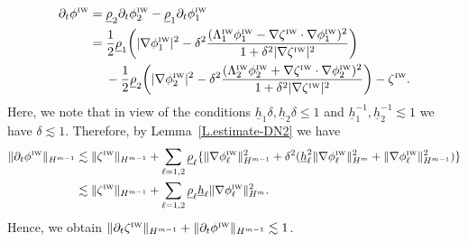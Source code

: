 \documentclass[11pt,leqno]{article}
\numberwithin{equation}{section}
\numberwithin{figure}{section}
\begin{document}
\begin{align*}
\partial_t\phi^{\mbox{\rm\tiny IW}}
&= \underline{\rho}_2\partial_t\phi_2^{\mbox{\rm\tiny IW}} - \underline{\rho}_1\partial_t\phi_1^{\mbox{\rm\tiny IW}} \\
&= \frac12\underline{\rho}_1\biggl( |\nabla\phi_1^{\mbox{\rm\tiny IW}}|^2
 - \delta^2 \frac{(\Lambda_1^{\mbox{\rm\tiny IW}}\phi_1^{\mbox{\rm\tiny IW}}
  - \nabla\zeta^{\mbox{\rm\tiny IW}} \cdot \nabla\phi_1^{\mbox{\rm\tiny IW}} )^2}{
  1+\delta^2|\nabla\zeta^{\mbox{\rm\tiny IW}}|^2} \biggr) \\
&\quad\;
 - \frac12\underline{\rho}_2\biggl( |\nabla\phi_2^{\mbox{\rm\tiny IW}}|^2
  - \delta^2 \frac{(\Lambda_2^{\mbox{\rm\tiny IW}}\phi_2^{\mbox{\rm\tiny IW}}
   + \nabla\zeta^{\mbox{\rm\tiny IW}} \cdot \nabla\phi_2^{\mbox{\rm\tiny IW}} )^2}{
  1+\delta^2|\nabla\zeta^{\mbox{\rm\tiny IW}}|^2} \biggr)
 - \zeta^{\mbox{\rm\tiny IW}}.
\end{align*}
%
Here, we note that in view of the conditions $\underline{h}_1\delta, \underline{h}_2\delta \leq 1$ and 
$\underline{h}_1^{-1}, \underline{h}_2^{-1}\lesssim 1$ we have $\delta\lesssim 1$. 
Therefore, by Lemma~\ref{L.estimate-DN2} we have 
%
\begin{align*}
\|\partial_t\phi^{\mbox{\rm\tiny IW}}\|_{H^{m-1}}
&\lesssim \|\zeta^{\mbox{\rm\tiny IW}}\|_{H^{m-1}}
 + \sum_{\ell=1,2}\underline{\rho}_\ell\{
  \|\nabla\phi_\ell^{\mbox{\rm\tiny IW}}\|_{H^{m-1}}^2
 + \delta^2(\underline{h}_\ell^2\|\nabla\phi_\ell^{\mbox{\rm\tiny IW}}\|_{H^m}^2
  + \|\nabla\phi_\ell^{\mbox{\rm\tiny IW}}\|_{H^{m-1}}^2) \} \\
&\lesssim \|\zeta^{\mbox{\rm\tiny IW}}\|_{H^{m-1}}
 + \sum_{\ell=1,2} \underline{\rho}_\ell \underline{h}_\ell \|\nabla\phi_\ell^{\mbox{\rm\tiny IW}}\|_{H^m}^2.
\end{align*}
%
Hence, we obtain $\|\partial_t\zeta^{\mbox{\rm\tiny IW}}\|_{H^{m-1}}+\|\partial_t\phi^{\mbox{\rm\tiny IW}}\|_{H^{m-1}} \lesssim 1$. 
\end{document}
